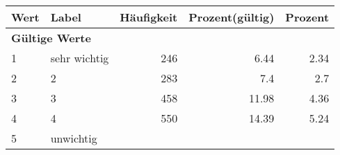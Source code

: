      \begin{longtable}{lXrrr}
     \toprule
     \textbf{Wert} & \textbf{Label} & \textbf{Häufigkeit} & \textbf{Prozent(gültig)} & \textbf{Prozent} \\
     \endhead
     \midrule
     \multicolumn{5}{l}{\textbf{Gültige Werte}}\\

     1 &
     \multicolumn{1}{X}{ sehr wichtig   } &


       \num{246} &
       \num[round-mode=places,round-precision=2]{6.44} &
         \num[round-mode=places,round-precision=2]{2.34} \\

     2 &
     \multicolumn{1}{X}{ 2   } &


       \num{283} &
       \num[round-mode=places,round-precision=2]{7.4} &
         \num[round-mode=places,round-precision=2]{2.7} \\

     3 &
     \multicolumn{1}{X}{ 3   } &


       \num{458} &
       \num[round-mode=places,round-precision=2]{11.98} &
         \num[round-mode=places,round-precision=2]{4.36} \\

     4 &
     \multicolumn{1}{X}{ 4   } &


       \num{550} &
       \num[round-mode=places,round-precision=2]{14.39} &
         \num[round-mode=places,round-precision=2]{5.24} \\

     5 &
     \multicolumn{1}{X}{ unwichtig   } &



\end{longtable}

